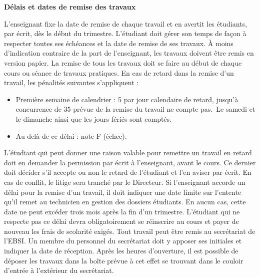 \documentclass [12 pt]{article}
\begin{document}
        \textbf{
        Délais et dates de remise des travaux
        }
    
            L'enseignant fixe la date de remise de chaque travail et en avertit les étudiants,
                par écrit, dès le début du trimestre. L'étudiant doit gérer son temps de façon à
                respecter toutes ses échéances et la date de remise de ses travaux. À moins
                d'indication contraire de la part de l'enseignant, les travaux doivent être remis en
                version papier. La remise de tous les travaux doit se faire au début de chaque cours
                ou séance de travaux pratiques.
            En cas de retard dans la remise d'un travail, les pénalités suivantes s'appliquent
                :
            
        \begin{itemize}
        
                
        \item Première semaine de calendrier : 5 %
                    par jour calendaire de retard, jusqu'à concurrence de 35 %
                    prévue de la remise du travail ne compte pas. Le samedi et le dimanche
                    ainsi que les jours fériés sont comptés.
                
        \item Au-delà de ce délai : note F (échec).
            
        \end{itemize}
    
            L'étudiant qui peut donner une raison valable pour remettre un travail en retard doit
                en demander la permission par écrit à l'enseignant, avant le cours. Ce dernier doit
                décider s'il accepte ou non le retard de l'étudiant et l'en aviser par écrit. En cas
                de conflit, le litige sera tranché par le Directeur.
            Si l'enseignant accorde un délai pour la remise d'un travail, il doit indiquer une
                date limite sur l'entente qu'il remet au technicien en gestion des dossiers
                étudiants. En aucun cas, cette date ne peut excéder trois mois après la fin d'un
                trimestre. L'étudiant qui ne respecte pas ce délai devra obligatoirement se
                réinscrire au cours et payer de nouveau les frais de scolarité exigés.
            Tout travail peut être remis au secrétariat de l'EBSI. Un membre du personnel du
                secrétariat doit y apposer ses initiales et indiquer la date de réception. Après les
                heures d'ouverture, il est possible de déposer les travaux dans la boîte prévue à
                cet effet se trouvant dans le couloir d'entrée à l'extérieur du secrétariat.
            
\end{document}
